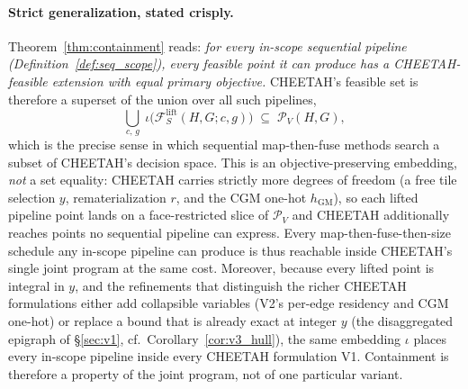 \paragraph{Strict generalization, stated crisply.}
Theorem~\ref{thm:containment} reads: \emph{for every in-scope sequential
pipeline (Definition~\ref{def:seq_scope}), every feasible point it can produce
has a CHEETAH-feasible extension with equal primary objective.} CHEETAH's
feasible set is therefore a superset of the union over all such pipelines,
$$
\bigcup_{c,\,g}\;\iota\big(\mathcal{F}_S^{\mathrm{lift}}(H,G;c,g)\big)
\;\subseteq\; \mathcal{P}_V(H,G),
$$
which is the precise sense in which sequential map-then-fuse methods search a
subset of CHEETAH's decision space. This is an objective-preserving embedding,
\emph{not} a set equality: CHEETAH carries strictly more degrees of freedom (a
free tile selection $y$, rematerialization $r$, and the CGM one-hot
$h_{\mathrm{GM}}$), so each lifted pipeline point lands on a face-restricted
slice of $\mathcal{P}_V$ and CHEETAH additionally reaches points no sequential
pipeline can express. Every map-then-fuse-then-size schedule any in-scope
pipeline can produce is thus reachable inside CHEETAH's single joint program at
the same cost. Moreover, because every lifted point is integral in $y$, and the
refinements that distinguish the richer CHEETAH formulations either add
collapsible variables (V2's per-edge residency and CGM one-hot) or replace a
bound that is already exact at integer $y$ (the disaggregated epigraph of
\S\ref{sec:v1}, cf.\ Corollary~\ref{cor:v3_hull}), the same embedding $\iota$
places every in-scope pipeline inside every CHEETAH formulation V1.
Containment is therefore a property of the joint program, not of one particular
variant.

